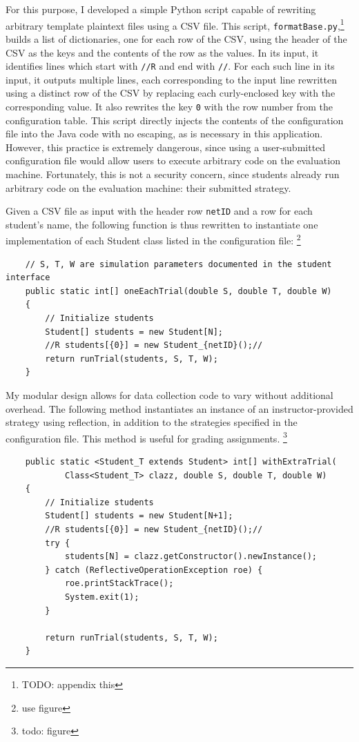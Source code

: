 \documentclass[pageno]{jpaper}
\begin{document}
For this purpose, I developed a simple Python script capable of rewriting arbitrary template plaintext files using a CSV file.
This script, \texttt{formatBase.py},\footnote{TODO: appendix this} builds a list of dictionaries, one for each row of the CSV, using the header of the CSV as the keys and the contents of the row as the values.
In its input, it identifies lines which start with \texttt{//R} and end with \texttt{//}.
For each such line in its input, it outputs multiple lines, each corresponding to the input line rewritten using a distinct row of the CSV by replacing each curly-enclosed key with the corresponding value.
It also rewrites the key \texttt{0} with the row number from the configuration table.
This script directly injects the contents of the configuration file into the Java code with no escaping, as is necessary in this application.
However, this practice is extremely dangerous, since using a user-submitted configuration file would allow users to execute arbitrary code on the evaluation machine.
Fortunately, this is not a security concern, since students already run arbitrary code on the evaluation machine: their submitted strategy.

Given a CSV file as input with the header row \texttt{netID} and a row for each student's name, the following function is thus rewritten to instantiate one implementation of each Student class listed in the configuration file:
\footnote{use figure}
\begin{verbatim}
    // S, T, W are simulation parameters documented in the student interface
    public static int[] oneEachTrial(double S, double T, double W)
    {
        // Initialize students
        Student[] students = new Student[N];
        //R students[{0}] = new Student_{netID}();//
        return runTrial(students, S, T, W);
    }
\end{verbatim}
My modular design allows for data collection code to vary without additional overhead.
The following method instantiates an instance of an instructor-provided strategy using reflection, in addition to the strategies specified in the configuration file.
This method is useful for grading assignments.
\footnote{todo: figure}
\begin{verbatim}
    public static <Student_T extends Student> int[] withExtraTrial(
            Class<Student_T> clazz, double S, double T, double W)
    {
        // Initialize students
        Student[] students = new Student[N+1];
        //R students[{0}] = new Student_{netID}();//
        try {
            students[N] = clazz.getConstructor().newInstance();
        } catch (ReflectiveOperationException roe) {
            roe.printStackTrace();
            System.exit(1);
        }

        return runTrial(students, S, T, W);
    }
\end{verbatim}
\end{document}

